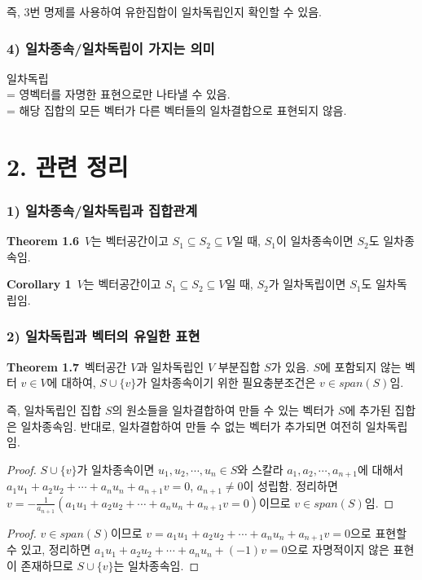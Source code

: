 즉, 3번 명제를 사용하여 유한집합이 일차독립인지 확인할 수 있음.


\subsubsection*{4) 일차종속/일차독립이 가지는 의미}
일차독립\\
= 영벡터를 자명한 표현으로만 나타낼 수 있음.\\ 
= 해당 집합의 모든 벡터가 다른 벡터들의 일차결합으로 표현되지 않음.\\


\newpage


\section*{2. 관련 정리}
\subsubsection*{1) 일차종속/일차독립과 집합관계}

\textbf{Theorem 1.6}\, $V$는 벡터공간이고 $S_1 \subseteq S_2 \subseteq V$일 때, $S_1$이 일차종속이면 $S_2$도 일차종속임.

\textbf{Corollary 1}\, $V$는 벡터공간이고 $S_1 \subseteq S_2 \subseteq V$일 때, $S_2$가 일차독립이면 $S_1$도 일차독립임.

\subsubsection*{2) 일차독립과 벡터의 유일한 표현}

\textbf{Theorem 1.7}\, 벡터공간 $V$과 일차독립인 $V$ 부분집합 $S$가 있음. $S$에 포함되지 않는 벡터 $v \in V$에 대하여, $S \cup \{v\}$가 일차종속이기 위한 필요충분조건은 $v \in span(S)$임.

즉, 일차독립인 집합 $S$의 원소들을 일차결합하여 만들 수 있는 벡터가 $S$에 추가된 집합은 일차종속임. 반대로, 일차결합하여 만들 수 없는 벡터가 추가되면 여전히 일차독립임.

\begin{proof}
$S \cup \{ v \}$가 일차종속이면 $u_1,u_2, \cdots ,u_n \in S$와 스칼라 $a_1,a_2, \cdots ,a_{n+1}$에 대해서 $a_1u_1+a_2u_2+ \cdots +a_nu_n+a_{n+1}v=0$, $a_{n+1} \not= 0$이 성립함. 정리하면 $v = - \frac{1}{a_{n+1}}(a_1u_1+a_2u_2+ \cdots +a_nu_n+a_{n+1}v=0)$이므로 $v \in span(S)$임.
\end{proof}

\begin{proof}
$v \in span(S)$이므로 $v = a_1u_1+a_2u_2+ \cdots +a_nu_n+a_{n+1}v=0$으로 표현할 수 있고, 정리하면 $a_1u_1+a_2u_2+ \cdots +a_nu_n+(-1)v=0$으로 자명적이지 않은 표현이 존재하므로 $S \cup \{ v \}$는 일차종속임.
\end{proof}


